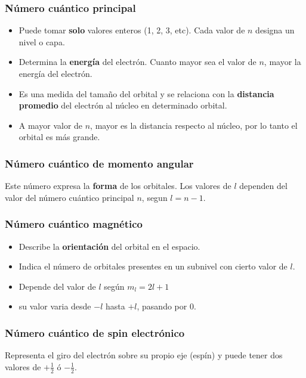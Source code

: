 \documentclass{article}
\begin{document}
\subsubsection{Número cuántico principal}
\begin{itemize}
    \item Puede tomar \textbf{solo} valores enteros (1, 2, 3, etc). Cada valor de $n$ designa un nivel o capa.
    \item Determina la \textbf{energía} del electrón. Cuanto mayor sea el valor de $n$, mayor la energía del electrón.
    \item Es una medida del tamaño del orbital y se relaciona con la \textbf{distancia promedio} del electrón al núcleo en determinado orbital.
    \item A mayor valor de $n$, mayor es la distancia respecto al núcleo, por lo tanto el orbital es más grande.
\end{itemize}

\subsubsection{Número cuántico de momento angular}
Este número expresa la \textbf{forma} de los orbitales. Los valores de $l$ dependen del valor del número cuántico principal $n$, segun $l=n-1$.


\subsubsection{Número cuántico magnético}
\begin{itemize}
    \item Describe la \textbf{orientación} del orbital en el espacio.
    \item Indica el número de orbitales presentes en un subnivel con cierto valor de $l$.
    \item Depende del valor de $l$ según $m_l=2l+1$
    \item su valor varia desde $-l$ hasta $+l$, pasando por 0.
    
\end{itemize}


\subsubsection{Número cuántico de spin electrónico}
Representa el giro del electrón sobre su propio eje (espín) y puede tener dos valores de $+\frac{1}{2}$ ó $-\frac{1}{2}$.
\end{document}
